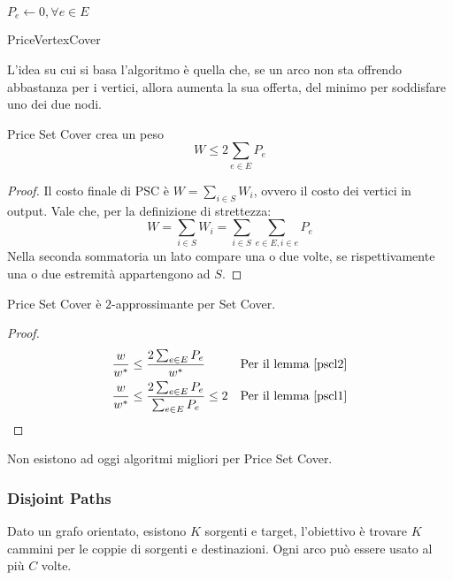 \begin{algorithm}[H]
    \SetAlgoLined
     $P_e \gets 0, \forall e \in E$\\
     \caption{PriceVertexCover}
\end{algorithm}
L'idea su cui si basa l'algoritmo è quella che, se un arco non sta offrendo abbastanza per i vertici, allora 
aumenta la sua offerta, del minimo per soddisfare uno dei due nodi.
\begin{lemma}
    \label{pscl2}
    Price Set Cover crea un peso $$W \leq 2\sum_{e \in E}P_e$$
\end{lemma}
\begin{proof}
    Il costo finale di PSC è $W = \sum_{i \in S}W_i$, ovvero il costo 
    dei vertici in output. Vale che, per la definizione di strettezza:
    $$W = \sum_{i \in S}W_i = \sum_{i \in S} \sum_{e\in E, i \in e}P_e$$
    Nella seconda sommatoria un lato compare una o due volte, se rispettivamente 
    una o due estremità appartengono ad $S$.
\end{proof}
\begin{theorem}
    Price Set Cover è $2$-approssimante per Set Cover.
\end{theorem}
\begin{proof}
    \begin{equation}
        \begin{aligned}
            \frac{w}{w^*} &\leq \frac{2\sum_{e \in E}P_e}{w^*} && \text{Per il lemma \ref{pscl2}}\\
            \frac{w}{w^*} &\leq \frac{2\sum_{e \in E}P_e}{\sum_{e \in E} P_e } \leq 2 && \text{Per il lemma \ref{pscl1}}
        \end{aligned}
    \end{equation}
\end{proof}
\begin{remark}
    Non esistono ad oggi algoritmi migliori per Price Set Cover.
\end{remark}

\subsubsection{Disjoint Paths}
Dato un grafo orientato, esistono $K$ sorgenti e target, l'obiettivo è trovare $K$ cammini per le 
coppie di sorgenti e destinazioni. Ogni arco può essere usato al più $C$ volte.

